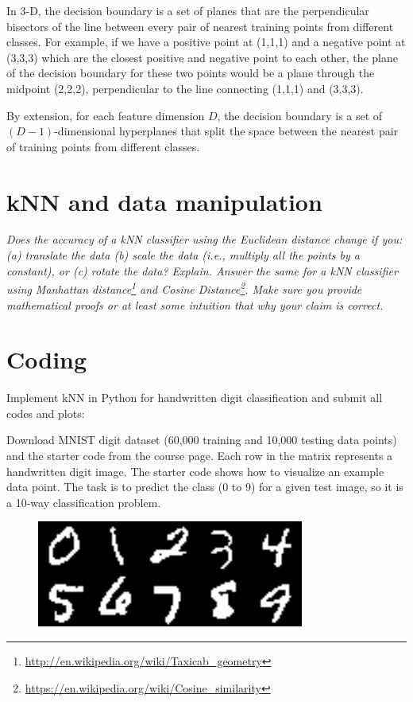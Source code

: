 \documentclass[fleqn]{article}
\begin{document}
In 3-D, the decision boundary is a set of planes that are the perpendicular bisectors of the line between every pair of nearest training points from different classes.
For example, if we have a positive point at (1,1,1) and a negative point at (3,3,3) which are the closest positive and negative point to each other,
the plane of the decision boundary for these two points would be a plane through the midpoint (2,2,2), perpendicular to the line connecting (1,1,1) and (3,3,3).

By extension, for each feature dimension $D$, the decision boundary is a set of $(D-1)$-dimensional hyperplanes that split the space between the nearest pair of training points from different classes.

\section{kNN and data manipulation}
\textit{Does the accuracy of a kNN classifier using the Euclidean distance change if you:(a) translate the data (b) scale the data (i.e., multiply all the points by a constant), or (c) rotate the data? Explain. Answer the same for a kNN classifier using Manhattan distance\footnote{\url{http://en.wikipedia.org/wiki/Taxicab_geometry}} and Cosine Distance\footnote{\url{https://en.wikipedia.org/wiki/Cosine_similarity}}. Make sure you provide mathematical proofs or at least some intuition that why your claim is correct.}

\section{Coding}

Implement kNN in Python for handwritten digit classification and submit all codes and plots:

Download MNIST digit dataset (60,000 training and 10,000 testing data points) and the starter code from the course page. Each row in the matrix represents a handwritten digit image. The starter code shows how to visualize an example data point. The task is to predict the class (0 to 9) for a given test image, so it is a 10-way classification problem.

\begin{figure}[h]
	\centering
	\includegraphics[width=.4\linewidth]{mnist-dataset.png}
\end{figure}
\end{document}

